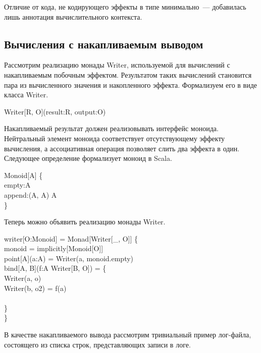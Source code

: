 Отличие от кода, не кодирующего эффекты в типе минимально~--- добавилась лишь аннотация вычислительного контекста.

\subsection{Вычисления с накапливаемым выводом}
Рассмотрим реализацию монады \<Writer\>, используемой для вычислений с накапливаемым побочным эффектом. Результатом таких вычислений становится пара из вычисленного значения и накопленного эффекта. Формализуем его в виде класса \<Writer\>.

\begin{haskell}
  Writer[R, O](result:R, output:O)
\end{haskell}

Накапливаемый результат должен реализовывать интерфейс моноида. Нейтральный элемент моноида соответствует отсутствующему эффекту вычисления, а ассоциативная операция позволяет слить два эффекта в один. Следующее определение формализует моноид в Scala.

\begin{haskell}
 Monoid[A] \{ \\
\quad{} empty:A \\
\quad{} append:(A, A) \Rightarrow A \\
\}
\end{haskell}

Теперь можно объявить реализацию монады \<Writer\>.

\begin{haskell}
  writer[O:Monoid] =  Monad[Writer[_, O]] \{ \\
\quad{}  monoid = implicitly[Monoid[O]] \\
\quad{} point[A](a:A) = Writer(a, monoid.empty) \\
\quad{} bind[A, B](f:A \Rightarrow Writer[B, O]) = \{ \\
\quad\quad{} Writer(a, o) \Rightarrow \\
\quad\quad\quad{} Writer(b, o2) = f(a) \\
\quad\quad\quad{}\\
\quad\}\\
\}
\end{haskell}

В качестве накапливаемого вывода рассмотрим тривиальный пример лог-файла, состоящего из списка строк, представляющих записи в логе.

